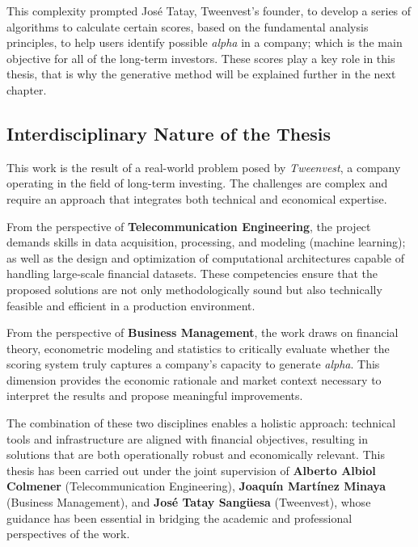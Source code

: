 \documentclass[11pt,english,a4paper,hidelinks]{book}
\begin{document}
\vspace{0.5cm}
\noindent This complexity prompted José Tatay, Tweenvest's founder, to develop a series of algorithms to calculate certain scores, based on the fundamental analysis principles, to help users identify possible \textit{alpha} in a company; which is the main objective for all of the long-term investors. These scores play a key role in this thesis, that is why the generative method will be explained further in the next chapter.

\subsection{Interdisciplinary Nature of the Thesis}

\noindent This work is the result of a real-world problem posed by \textit{Tweenvest}, a company operating in the field of long-term investing. The challenges are complex and require an approach that integrates both technical and economical expertise.

\vspace{0.5cm}
\noindent From the perspective of \textbf{Telecommunication Engineering}, the project demands skills in data acquisition, processing, and modeling (machine learning); as well as the design and optimization of computational architectures capable of handling large-scale financial datasets. These competencies ensure that the proposed solutions are not only methodologically sound but also technically feasible and efficient in a production environment.

\vspace{0.5cm}
\noindent From the perspective of \textbf{Business Management}, the work draws on financial theory, econometric modeling and statistics to critically evaluate whether the scoring system truly captures a company’s capacity to generate \textit{alpha}. This dimension provides the economic rationale and market context necessary to interpret the results and propose meaningful improvements.

\vspace{0.5cm}
\noindent The combination of these two disciplines enables a holistic approach: technical tools and infrastructure are aligned with financial objectives, resulting in solutions that are both operationally robust and economically relevant. This thesis has been carried out under the joint supervision of \textbf{Alberto Albiol Colmener} (Telecommunication Engineering), \textbf{Joaquín Martínez Minaya} (Business Management), and \textbf{José Tatay Sangüesa} (Tweenvest), whose guidance has been essential in bridging the academic and professional perspectives of the work.
\end{document}

